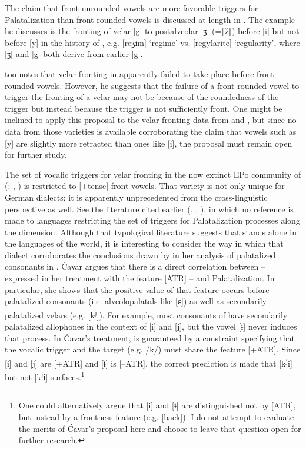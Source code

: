 The claim that front unrounded vowels are more favorable triggers for Palatalization than front rounded vowels is discussed at length in \citet{Neeld1973}. The example he discusses is the fronting of velar [g] to postalveolar [ʒ] (=⟦ž⟧) before [i] but not before [y] in the history of , e.g. [reʒim] ‘regime’ vs. [regylarite] ‘regularity’, where [ʒ] and [g] both derive from earlier [g].

\citet[61]{Bhat1978} too notes that velar fronting in  apparently failed to take place before front rounded vowels. However, he suggests that the failure of a front rounded vowel to trigger the fronting of a velar may not be because of the roundedness of the trigger but instead because the trigger is not sufficiently front. One might be inclined to apply this proposal to the velar fronting data from  and , but since no data from those varieties is available corroborating the claim that vowels such as [y] are slightly more retracted than ones like [i], the proposal must remain open for further study.

The set of vocalic triggers for velar fronting in the now extinct EPo community of  (\citealt{Mischke1936}; , ) is restricted to [+tense] front vowels. That variety is not only unique for German dialects; it is apparently unprecedented from the cross-linguistic perspective as well. See the literature cited earlier (\citealt{Bhat1978}, \citealt{Bateman2007,Bateman2011}, \citealt{Kochetov2011}), in which no reference is made to languages restricting the set of triggers for Palatalization processes along the  dimension. Although that typological literature suggests that  stands alone in the languages of the world, it is interesting to consider the way in which that dialect corroborates the conclusions drawn by \citet{Ćavar2007} in her analysis of palatalized consonants in . Ćavar argues that there is a direct correlation between  -- expressed in her treatment with the feature [ATR] -- and Palatalization. In particular, she shows that the positive value of that feature occurs before palatalized consonants (i.e. alveolopalatals like [ɕ]) as well as secondarily palatalized velars (e.g. [k\textsuperscript{j}]). For example, most consonants of  have secondarily palatalized allophones in the context of [i] and [j], but the vowel [ɨ] never induces that process. In Ćavar’s treatment,  is guaranteed by a constraint specifying that the vocalic trigger and  the target (e.g. /k/) must share the  feature [+ATR]. Since [i] and [j] are [+ATR] and [ɨ] is [--ATR], the correct prediction is made that [k\textsuperscript{j}i] but not [k\textsuperscript{j}ɨ] surfaces.\footnote{One could alternatively argue that [i] and [ɨ] are distinguished not by [ATR], but instead by a frontness feature (e.g. [back]). I do not attempt to evaluate the merits of Ćavar’s proposal here and choose to leave that question open for further research.}

